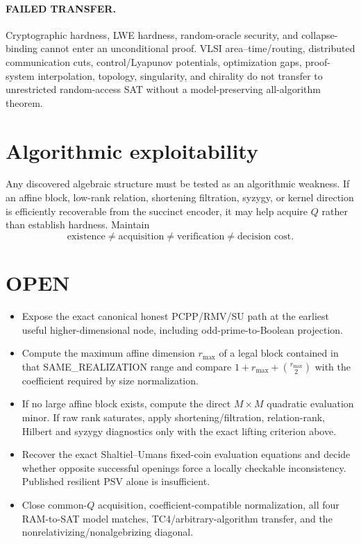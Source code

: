 \documentclass[11pt]{article}
\begin{document}
\paragraph{FAILED TRANSFER.} Cryptographic hardness, LWE hardness, random-oracle security, and collapse-binding cannot enter an unconditional proof. VLSI area--time/routing, distributed communication cuts, control/Lyapunov potentials, optimization gaps, proof-system interpolation, topology, singularity, and chirality do not transfer to unrestricted random-access SAT without a model-preserving all-algorithm theorem.

\section*{Algorithmic exploitability}
Any discovered algebraic structure must be tested as an algorithmic weakness. If an affine block, low-rank relation, shortening filtration, syzygy, or kernel direction is efficiently recoverable from the succinct encoder, it may help acquire \(Q\) rather than establish hardness. Maintain
\[ \text{existence}\ne\text{acquisition}\ne\text{verification}\ne\text{decision cost}. \]

\section*{OPEN}
\begin{itemize}
\item Expose the exact canonical honest PCPP/RMV/SU path at the earliest useful higher-dimensional node, including odd-prime-to-Boolean projection.
\item Compute the maximum affine dimension \(r_{\max}\) of a legal block contained in that SAME\_REALIZATION range and compare \(1+r_{\max}+\binom{r_{\max}}2\) with the coefficient required by size normalization.
\item If no large affine block exists, compute the direct \(M\times M\) quadratic evaluation minor. If raw rank saturates, apply shortening/filtration, relation-rank, Hilbert and syzygy diagnostics only with the exact lifting criterion above.
\item Recover the exact Shaltiel--Umans fixed-coin evaluation equations and decide whether opposite successful openings force a locally checkable inconsistency. Published resilient PSV alone is insufficient.
\item Close common-\(Q\) acquisition, coefficient-compatible normalization, all four RAM-to-SAT model matches, TC4/arbitrary-algorithm transfer, and the nonrelativizing/nonalgebrizing diagonal.
\end{itemize}
\end{document}
